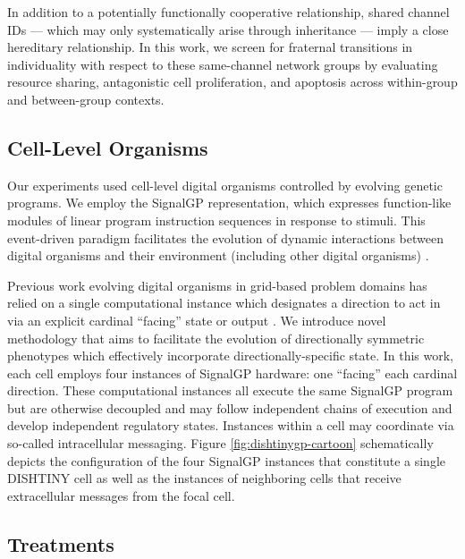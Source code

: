 In addition to a potentially functionally cooperative relationship, shared channel IDs --- which may only systematically arise through inheritance --- imply a close hereditary relationship.
In this work, we screen for fraternal transitions in individuality with respect to these same-channel network groups by evaluating resource sharing, antagonistic cell proliferation, and apoptosis across within-group and between-group contexts.

\subsection{Cell-Level Organisms}



Our experiments used cell-level digital organisms controlled by evolving
genetic programs.
We employ the SignalGP representation, which expresses function-like modules of linear program instruction sequences in response to stimuli.
This event-driven paradigm facilitates the evolution of dynamic interactions between digital organisms and their environment (including other digital organisms) \cite{lalejini2018evolving}.

Previous work evolving digital organisms in grid-based problem domains has relied on a single computational instance which designates a direction to act in via an explicit cardinal ``facing'' state or output \cite{goldsby2014evolutionary, goldsby2018serendipitous, grabowski2010early, biswas2014causes, lalejini2018evolving}.
We introduce novel methodology that aims to facilitate the evolution of directionally symmetric phenotypes which effectively incorporate directionally-specific state.
In this work, each cell employs four instances of SignalGP hardware: one ``facing'' each cardinal direction.
These computational instances all execute the same SignalGP program but are otherwise decoupled and may follow independent chains of execution and develop independent regulatory states.
Instances within a cell may coordinate via so-called intracellular messaging.
Figure \ref{fig:dishtinygp-cartoon} schematically depicts the configuration of the four SignalGP instances that constitute a single DISHTINY cell as well as the instances of neighboring cells that receive extracellular messages from the focal cell.

\subsection{Treatments}

